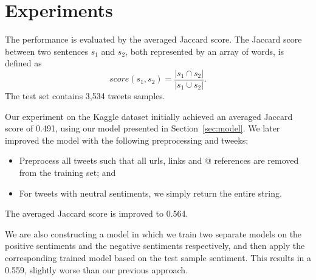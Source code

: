 \section{Experiments} \label{sec:experiment}

The performance is evaluated by the averaged Jaccard score. The Jaccard score between two sentences $s_1$ and $s_2$, both represented by an array of words, is defined as $$score(s_1, s_2) = \frac{|s_1 \cap s_2|}{|s_1 \cup s_2|}.$$ The test set contains 3,534 tweets samples.

Our experiment on the Kaggle dataset initially achieved an averaged Jaccard score of 0.491, using our model presented in Section~\ref{sec:model}. We later improved the model with the following preprocessing and tweeks:

\begin{itemize}
	\item Preprocess all tweets such that all urls, links and @ references are removed from the training set; and
	\item For tweets with neutral sentiments, we simply return the entire string.  
\end{itemize}

The averaged Jaccard score is improved to 0.564.
 
We are also constructing a model in which we train two separate models on the positive sentiments and the negative sentiments respectively, and then apply the corresponding trained model based on the test sample sentiment. This results in a 0.559, slightly worse than our previous approach.
